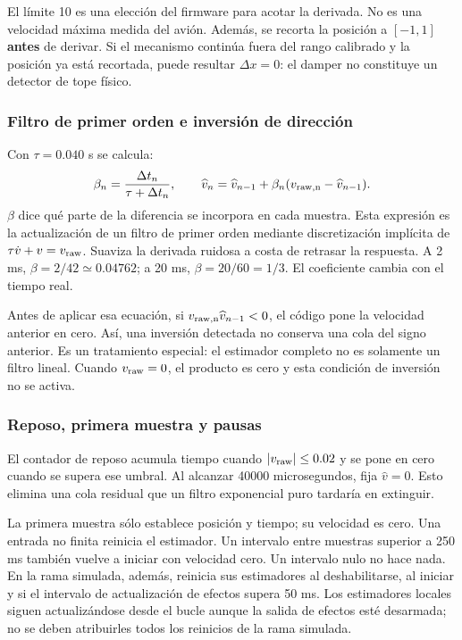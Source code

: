 El límite 10 es una elección del firmware para acotar la derivada. No es una velocidad máxima medida del avión. Además, se recorta la posición a $[-1,1]$ \textbf{antes} de derivar. Si el mecanismo continúa fuera del rango calibrado y la posición ya está recortada, puede resultar $\Delta x=0$: el damper no constituye un detector de tope físico.

\subsubsection{Filtro de primer orden e inversión de dirección}
Con $\tau=0.040$ s se calcula:
\begin{equation}
\beta_n=\frac{\Delta t_n}{\tau+\Delta t_n},\qquad
\widehat v_n=\widehat v_{n-1}+\beta_n(v_{\rm raw,n}-\widehat v_{n-1}).
\label{eq:damper_filtro}
\end{equation}
$\beta$ dice qué parte de la diferencia se incorpora en cada muestra. Esta expresión es la actualización de un filtro de primer orden mediante discretización implícita de $\tau\dot{v}+v=v_{\rm raw}$. Suaviza la derivada ruidosa a costa de retrasar la respuesta. A 2 ms, $\beta=2/42\simeq0.04762$; a 20 ms, $\beta=20/60=1/3$. El coeficiente cambia con el tiempo real.

Antes de aplicar esa ecuación, si $v_{\rm raw,n}\widehat v_{n-1}<0$, el código pone la velocidad anterior en cero. Así, una inversión detectada no conserva una cola del signo anterior. Es un tratamiento especial: el estimador completo no es solamente un filtro lineal. Cuando $v_{\rm raw}=0$, el producto es cero y esta condición de inversión no se activa.

\subsubsection{Reposo, primera muestra y pausas}
El contador de reposo acumula tiempo cuando $|v_{\rm raw}|\le0.02$ y se pone en cero cuando se supera ese umbral. Al alcanzar 40000 microsegundos, fija $\widehat v=0$. Esto elimina una cola residual que un filtro exponencial puro tardaría en extinguir.

La primera muestra sólo establece posición y tiempo; su velocidad es cero. Una entrada no finita reinicia el estimador. Un intervalo entre muestras superior a 250 ms también vuelve a iniciar con velocidad cero. Un intervalo nulo no hace nada. En la rama simulada, además,  reinicia sus estimadores al deshabilitarse, al iniciar y si el intervalo de actualización de efectos supera 50 ms. Los estimadores locales siguen actualizándose desde el bucle aunque la salida de efectos esté desarmada; no se deben atribuirles todos los reinicios de la rama simulada.

